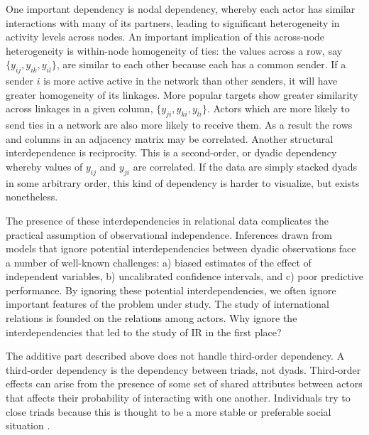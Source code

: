\documentclass[12pt]{amsart}
\begin{document}
One important dependency is nodal dependency, whereby each actor has similar interactions with many of its partners, leading to significant heterogeneity in activity levels across nodes. An important implication of this across-node heterogeneity is within-node homogeneity of ties: the values across a row, say $\{y_{ij},y_{ik},y_{il}\}$, are similar to each other because each has a common sender. If a sender $i$ is more active active in the network than other senders, it will have greater homogeneity of its linkages. More popular targets show greater similarity across linkages in a given column, $\{y_{ji},y_{ki},y_{li}\}$. Actors which are more likely to send ties in a network are also more likely to receive them. As a result the rows and columns in an adjacency matrix may be correlated. Another structural interdependence is reciprocity. This is a second-order, or dyadic dependency whereby values of $y_{ij}$ and $y_{ji}$ are correlated. If the data are simply stacked dyads in some arbitrary order, this kind of dependency is harder to visualize, but exists nonetheless.

The presence of these interdependencies in relational data complicates the practical assumption of observational independence.  Inferences drawn from models that ignore potential interdependencies between dyadic observations face a number of well-known challenges: a) biased estimates of the effect of independent variables, b) uncalibrated confidence intervals, and c) poor predictive performance. By ignoring these potential interdependencies, we often ignore important features of the problem under study. The study of international relations is founded on the relations among actors. Why ignore the interdependencies that led to the study of IR in the first place?

The additive part described above does not handle third-order dependency. A third-order dependency is the dependency between triads, not dyads. Third-order effects can arise from the presence of some set of shared attributes between actors that affects their probability of interacting with one another. Individuals try to close triads because this is thought to be a more stable or preferable social situation \citep{wasserman:faust:1994,zinnes:1967}.
\end{document}
